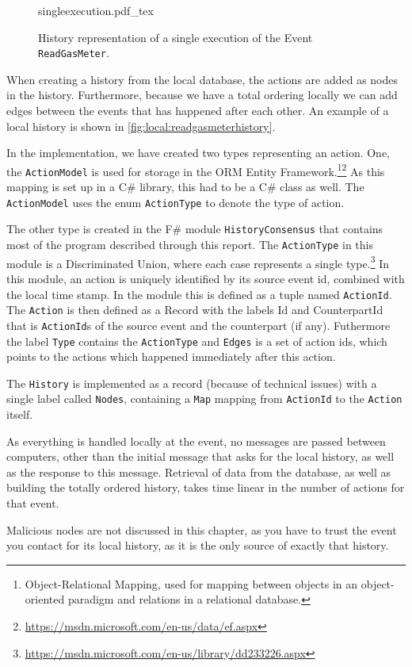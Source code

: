 	\begin{figure}
		\centering
		{singleexecution.pdf_tex}
		\caption{History representation of a single execution of the Event \texttt{ReadGasMeter}.}
		\label{fig:local:readgasmeterhistory}
	\end{figure}
	\newpar When creating a history from the local database, the actions are added as nodes in the history. Furthermore, because we have a total ordering locally we can add edges between the events that has happened after each other. An example of a local history is shown in \autoref{fig:local:readgasmeterhistory}.
	
	\newpar In the implementation, we have created two types representing an action. One, the \texttt{ActionModel} is used for storage in the ORM Entity Framework.\footnote{Object-Relational Mapping, used for mapping between objects in an object-oriented paradigm and relations in a relational database.}\footnote{\url{https://msdn.microsoft.com/en-us/data/ef.aspx}} As this mapping is set up in a C\# library, this had to be a C\# class as well. The \texttt{ActionModel} uses the enum \texttt{ActionType} to denote the type of action.
	
	The other type is created in the F\# module \texttt{HistoryConsensus} that contains most of the program described through this report. The \texttt{ActionType} in this module is a Discriminated Union, where each case represents a single type.\footnote{\url{https://msdn.microsoft.com/en-us/library/dd233226.aspx}}
	In this module, an action is uniquely identified by its source event id, combined with the local time stamp. In the module this is defined as a tuple named \texttt{ActionId}.
	The \texttt{Action} is then defined as a Record with the labels Id and CounterpartId that is \texttt{ActionId}s of the source event and the counterpart (if any). Futhermore the label \texttt{Type} contains the \texttt{ActionType} and \texttt{Edges} is a set of action ids, which points to the actions which happened immediately after this action.
	
	The \texttt{History} is implemented as a record (because of technical issues) with a single label called \texttt{Nodes}, containing a \texttt{Map} mapping from \texttt{ActionId} to the \texttt{Action} itself.
	
	\newpar As everything is handled locally at the event, no messages are passed between computers, other than the initial message that asks for the local history, as well as the response to this message. Retrieval of data from the database, as well as building the totally ordered history, takes time linear in the number of actions for that event.
	
	\newpar Malicious nodes are not discussed in this chapter, as you have to trust the event you contact for its local history, as it is the only source of exactly that history.
